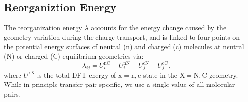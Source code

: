 \documentclass[%
 reprint,
superscriptaddress,
 amsmath,amssymb,
 aps,
prb,
floatfix
]{revtex4-2}
\begin{document}
\subsection{Reorganiztion Energy}
 The reorganization energy $\lambda$ accounts for the energy change caused by the geometry variation during the charge transport, and is linked to four points on the potential energy surfaces of neutral (n) and charged (c) molecules at neutral (N) or charged (C) equilibrium geometries via:
%
\begin{equation}
    \lambda_{ij} = U_i^\text{nC} - U_i^\text{nN} + U_j^\text{cN} - U_j^\text{cC},
    \label{eq:lambda}
\end{equation}
%
where $U^\text{xX}$ is the total DFT energy of $\text{x}=\text{n},\text{c}$ state in the $\text{X}=\text{N},\text{C}$ geometry. While in principle transfer pair specific, we use a single value of all molecular pairs.
\end{document}
